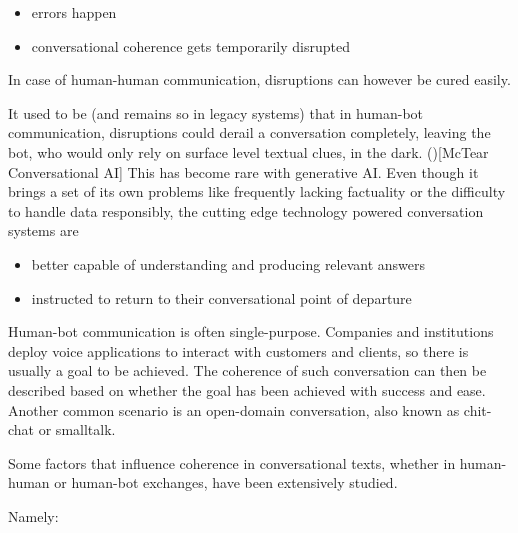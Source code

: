 \documentclass[12pt]{report}
\begin{document}
\begin{itemize}
\item
errors happen
\item
conversational coherence gets temporarily disrupted
\end{itemize}

In case of human-human communication, disruptions can however be cured easily.

\par
It used to be (and remains so in legacy systems)
that in human-bot communication, disruptions could derail a conversation completely,
leaving the bot, who would only rely on surface level textual clues, in the dark. ()[McTear Conversational AI]
This has become rare with generative AI.
Even though it brings a set of its own problems like
frequently lacking factuality or
the difficulty to handle data responsibly,
the cutting edge technology powered conversation systems are

\begin{itemize}

\item
   better capable of understanding and producing relevant answers

\item
   instructed to return to their conversational point of departure
\end{itemize}

\par
Human-bot communication is often single-purpose.
Companies and institutions deploy voice applications to interact with customers and clients,
so there is usually a goal to be achieved.
The coherence of such conversation can then be described based on whether
the goal has been achieved with success and ease.
Another common scenario is an open-domain conversation,
also known as chit-chat or smalltalk.

\par
Some factors that influence coherence in conversational texts,
whether in human-human or human-bot exchanges,
have been extensively studied.
\par
Namely:
\end{document}
